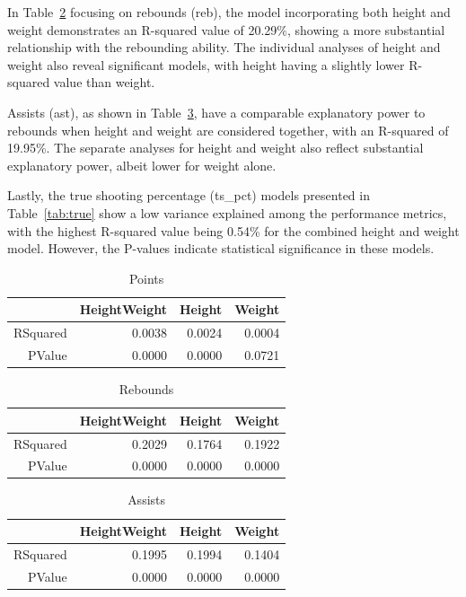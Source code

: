 \documentclass[12pt]{article}
\begin{document}
In Table~\ref{tab:reb} focusing on rebounds (reb), the model incorporating both height and weight demonstrates 
an R-squared value of 20.29\%, showing a more substantial relationship with the rebounding ability. The individual 
analyses of height and weight also reveal significant models, with height having a slightly lower R-squared value 
than weight.

Assists (ast), as shown in Table~\ref{tab:ast}, have a comparable explanatory power to rebounds when height and 
weight are considered together, with an R-squared of 19.95\%. The separate analyses for height and weight also 
reflect substantial explanatory power, albeit lower for weight alone.

Lastly, the true shooting percentage (ts\_pct) models presented in Table~\ref{tab:true} show a low variance explained 
among the performance metrics, with the highest R-squared value being 0.54\% for the combined height and weight 
model. However, the P-values indicate statistical significance in these models.

\begin{table}[ht]
\caption{Points}
\label{tab:pts}
\centering
\begin{tabular}{rrrr}
  \hline
 & HeightWeight & Height & Weight \\ 
  \hline
RSquared & 0.0038 & 0.0024 & 0.0004 \\ 
  PValue & 0.0000 & 0.0000 & 0.0721 \\ 
   \hline
\end{tabular}
\end{table}

\clearpage

\begin{table}[ht]
\caption{Rebounds}
\label{tab:reb}
\centering
\begin{tabular}{rrrr}
  \hline
 & HeightWeight & Height & Weight \\ 
  \hline
RSquared & 0.2029 & 0.1764 & 0.1922 \\ 
  PValue & 0.0000 & 0.0000 & 0.0000 \\ 
   \hline
\end{tabular}
\end{table}

\begin{table}[ht]
\caption{Assists}
\label{tab:ast}
\centering
\begin{tabular}{rrrr}
  \hline
 & HeightWeight & Height & Weight \\ 
  \hline
RSquared & 0.1995 & 0.1994 & 0.1404 \\ 
  PValue & 0.0000 & 0.0000 & 0.0000 \\ 
   \hline
\end{tabular}
\end{table}
\end{document}
